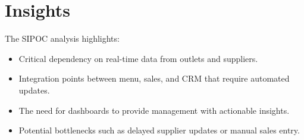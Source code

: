 \section*{Insights}
The SIPOC analysis highlights:
\begin{itemize}
    \item Critical dependency on real-time data from outlets and suppliers.
    \item Integration points between menu, sales, and CRM that require automated updates.
    \item The need for dashboards to provide management with actionable insights.
    \item Potential bottlenecks such as delayed supplier updates or manual sales entry.
\end{itemize}
